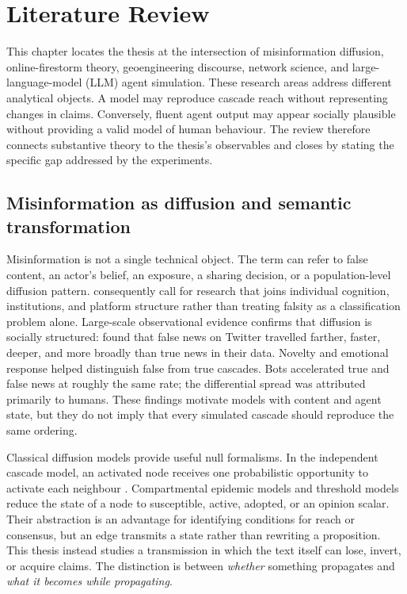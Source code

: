 \chapter{Literature Review}
\label{chap:related_work}

This chapter locates the thesis at the intersection of misinformation diffusion,
online-firestorm theory, geoengineering discourse, network science, and
large-language-model (LLM) agent simulation.  These research areas address different analytical objects. A model may
reproduce cascade reach without representing changes in claims. Conversely,
fluent agent output may appear socially plausible without providing a valid
model of human behaviour.  The review therefore
connects substantive theory to the thesis's observables and closes by stating
the specific gap addressed by the experiments.

\section{Misinformation as diffusion and semantic transformation}
\label{sec:lit-misinformation}

Misinformation is not a single technical object.  The term can refer to false
content, an actor's belief, an exposure, a sharing decision, or a population-level
diffusion pattern.  \textcite{lazer2018science} consequently call for research
that joins individual cognition, institutions, and platform structure rather
than treating falsity as a classification problem alone.  Large-scale
observational evidence confirms that diffusion is socially structured:
\textcite{vosoughi2018false} found that false news on Twitter travelled farther,
faster, deeper, and more broadly than true news in their data.  Novelty and
emotional response helped distinguish false from true cascades. Bots
accelerated true and false news at roughly the same rate; the differential
spread was attributed primarily to humans.  These findings motivate models with content and
agent state, but they do not imply that every simulated cascade should reproduce
the same ordering.

Classical diffusion models provide useful null formalisms.  In the independent
cascade model, an activated node receives one probabilistic opportunity to
activate each neighbour \parencite{kempe2003influence}.  Compartmental
epidemic models \parencite{kermack1927epidemics} and threshold models
\parencite{granovetter1978threshold} reduce the state of a node to
susceptible, active, adopted, or an opinion scalar.  Their abstraction is an advantage for identifying
conditions for reach or consensus, but an edge transmits a state rather than
rewriting a proposition.  This thesis instead studies a transmission in which
the text itself can lose, invert, or acquire claims.  The distinction is between
\emph{whether} something propagates and \emph{what it becomes while propagating}.


